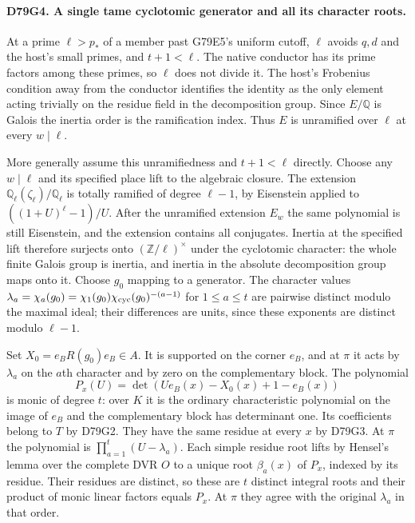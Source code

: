 \paragraph{D79G4. A single tame cyclotomic generator and all its character roots.}
At a prime $\ell>p_*$ of a member past G79E5's uniform cutoff,
$\ell$ avoids $q,d$ and the host's small primes, and $t+1<\ell$.
The native conductor has its prime factors among these primes,
so $\ell$ does not divide it. The host's Frobenius condition
away from the conductor identifies the identity as the only element
acting trivially on the residue field in the decomposition group.
Since $E/\mathbb Q$ is Galois the inertia order is the ramification
index. Thus $E$ is unramified over $\ell$ at every $w\mid\ell$.

More generally assume this unramifiedness and $t+1<\ell$ directly.
Choose any $w\mid\ell$ and its specified place lift to the algebraic
closure. The extension $\mathbb Q_\ell(\zeta_\ell)/\mathbb Q_\ell$
is totally ramified of degree $\ell-1$, by Eisenstein applied to
$((1+U)^\ell-1)/U$. After the unramified extension $E_w$ the same
polynomial is still Eisenstein, and the extension contains all
conjugates. Inertia at the specified lift therefore surjects onto
$(\mathbb Z/\ell)^\times$ under the cyclotomic character: the
whole finite Galois group is inertia, and inertia in the absolute
decomposition group maps onto it. Choose $g_0$ mapping to a
generator. The character values
$\lambda_a=\chi_a(g_0)=\chi_1(g_0)\chi_{\rm cyc}(g_0)^{-(a-1)}$
for $1\le a\le t$ are pairwise distinct modulo the maximal ideal;
their differences are units, since these exponents are distinct
modulo $\ell-1$.

Set $X_0=e_B R(g_0)e_B\in A$. It is supported on the corner
$e_B$, and at $\pi$ it acts by $\lambda_a$ on the $a$th
character and by zero on the complementary block. The polynomial
\[
 P_x(U)=\det(Ue_B(x)-X_0(x)+1-e_B(x))
\]
is monic of degree $t$: over $K$ it is the ordinary characteristic
polynomial on the image of $e_B$ and the complementary block has
determinant one. Its coefficients belong to $T$ by D79G2.
They have the same residue at every $x$ by D79G3. At $\pi$ the
polynomial is $\prod_{a=1}^t(U-\lambda_a)$. Each simple residue
root lifts by Hensel's lemma over the complete DVR $O$ to a unique
root $\beta_a(x)$ of $P_x$, indexed by its residue. Their residues
are distinct, so these are $t$ distinct integral roots and their
product of monic linear factors equals $P_x$. At $\pi$ they
agree with the original $\lambda_a$ in that order.

